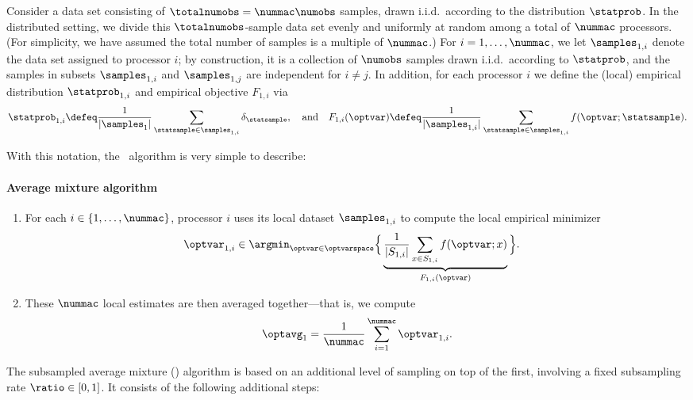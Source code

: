 \documentclass[11pt,twoside]{article}
\theoremstyle{definition}
\newcommand{\MYMIN}[1]{\ensuremath{\Big\{#1 \Big \}}}
\begin{document}
Consider a data set consisting of $\totalnumobs = \nummac \numobs$
samples, drawn i.i.d.\ according to the distribution
$\statprob$.  In the distributed setting, we divide this
$\totalnumobs$-sample data set evenly and uniformly at random among a
total of $\nummac$ processors.  (For simplicity, we have assumed the
total number of samples is a multiple of $\nummac$.)  For $i = 1,
\ldots, \nummac$, we let $\samples_{1,i}$ denote the data set assigned
to processor $i$; by construction, it is a collection of $\numobs$
samples drawn i.i.d.\ according to $\statprob$, and the samples in
subsets $\samples_{1,i}$ and $\samples_{1,j}$ are independent for $i
\neq j$.  In addition, for each processor $i$ we define the (local)
empirical distribution $\statprob_{1,i}$ and empirical objective
$F_{1,i}$ via
\begin{equation}
\label{EqnDefnLocalQuants}
  \statprob_{1,i} \defeq \frac{1}{|\samples_1|} \sum_{\statsample \in
    \samples_{1,i}} \delta_{\statsample}, ~~~ \mbox{and} ~~~
  F_{1,i}(\optvar) \defeq \frac{1}{|\samples_{1,i}|} \sum_{\statsample
    \in \samples_{1,i}} f(\optvar; \statsample).
\end{equation}

\noindent With this notation, the \avgm\ algorithm is very simple to
describe:
%
\paragraph{Average mixture algorithm}
\begin{enumerate}
\item[(1)] For each $i \in \{1, \ldots, \nummac\}$, processor $i$ uses
  its local dataset $\samples_{1, i}$ to compute the local empirical
  minimizer
  \begin{align}
    \label{EqnDefnLocalEmpMin}
    \optvar_{1, i} & \in \argmin_{\optvar \in \optvarspace}
    \MYMIN{\underbrace{\frac{1}{|S_{1,i}|} \sum_{x \in S_{1,i}} f(\optvar;
      x)}_{F_{1,i}(\optvar)}}.
  \end{align}
\item[(2)] These $\nummac$ local estimates are then averaged
  together---that is, we compute
  \begin{equation}
    \label{eqn:avgm-alg-def}
   \optavg_1 = \frac{1}{\nummac} \sum_{i = 1}^\nummac \optvar_{1, i}.
  \end{equation}
\end{enumerate}

The subsampled average mixture (\savgm) algorithm is based on an
additional level of sampling on top of the first, involving a fixed
subsampling rate $\ratio \in [0, 1]$.  It consists of
the following additional steps:
\end{document}
